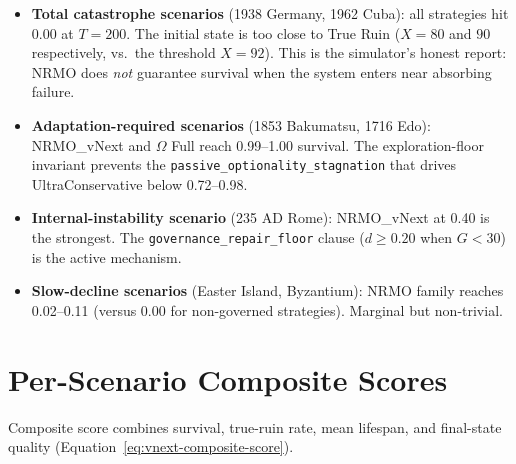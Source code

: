 \begin{itemize}
\item \textbf{Total catastrophe scenarios} (1938 Germany, 1962
Cuba): all strategies hit 0.00 at $T = 200$. The initial state
is too close to True Ruin ($X = 80$ and $90$ respectively, vs.~the
threshold $X = 92$). This is the simulator's honest report:
NRMO does \emph{not} guarantee survival when the system enters
near absorbing failure.
\item \textbf{Adaptation-required scenarios} (1853 Bakumatsu,
1716 Edo): NRMO\_vNext and $\Omega$ Full reach 0.99--1.00 survival.
The exploration-floor invariant prevents the
\texttt{passive\_optionality\allowbreak\_stagnation} that drives
UltraConservative below 0.72--0.98.
\item \textbf{Internal-instability scenario} (235 AD Rome):
NRMO\_vNext at 0.40 is the strongest. The
\texttt{governance\_repair\_floor} clause ($d \ge 0.20$ when
$G < 30$) is the active mechanism.
\item \textbf{Slow-decline scenarios} (Easter Island, Byzantium):
NRMO family reaches 0.02--0.11 (versus 0.00 for non-governed
strategies). Marginal but non-trivial.
\end{itemize}

\section{Per-Scenario Composite Scores}
\label{sec:hist-scores}

Composite score combines survival, true-ruin rate, mean lifespan,
and final-state quality (Equation~\ref{eq:vnext-composite-score}).

